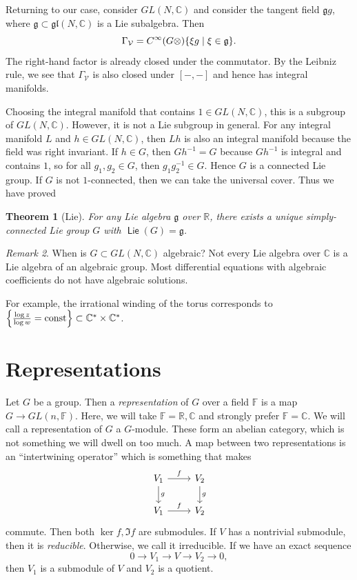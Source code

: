 \documentclass[leqno, openany]{memoir}
\newtheorem{thm}{Theorem}[section]
\theoremstyle{definition}
\theoremstyle{remark}
\newtheorem{rmk}[thm]{Remark}
\theoremstyle{plain}
\theoremstyle{definition}
\theoremstyle{remark}
\newcommand{\F}{\mathbb{F}}
\newcommand{\R}{\mathbb{R}}
\newcommand{\C}{\mathbb{C}}
\newcommand{\mc}[1]{\mathcal{#1}}
\newcommand{\mf}[1]{\mathfrak{#1}}
\newcommand{\mr}[1]{\mathrm{#1}}
\DeclareMathOperator{\Lie}{\mathsf{Lie}}
\begin{document}
Returning to our case, consider $GL(N, \C)$ and consider the tangent field $\mf{g} g$, where $\mf{g} \subset \mf{gl}(N, \C)$ is a Lie subalgebra. Then 
\[ \Gamma_{\mc{V}} = C^{\infty}(G \otimes) \qty{ \xi g \mid \xi \in \mf{g} }. \] 
The right-hand factor is already closed under the commutator. By the Leibniz rule, we see that $\Gamma_{\mc{V}}$ is also closed under $[-,-]$ and hence has integral manifolds.

Choosing the integral manifold that contains $1 \in GL(N, \C)$, this is a subgroup of $GL(N, \C)$. However, it is not a Lie subgroup in general. For any integral manifold $L$ and $h \in GL(N, \C)$, then $Lh$ is also an integral manifold because the field was right invariant. If $h \in G$, then $Gh^{-1} = G$ because $Gh^{-1}$ is integral and contains $1$, so for all $g_1, g_2 \in G$, then $g_1 g_2^{-1} \in G$. Hence $G$ is a connected Lie group. If $G$ is not $1$-connected, then we can take the universal cover. Thus we have proved

\begin{thm}[Lie]
    For any Lie algebra $\mf{g}$ over $\R$, there exists a unique simply-connected Lie group $G$ with $\Lie(G) = \mf{g}$.
\end{thm}

\begin{rmk}
    When is $G \subset GL(N, \C)$ algebraic? Not every Lie algebra over $\C$ is a Lie algebra of an algebraic group. Most differential equations with algebraic coefficients do not have algebraic solutions.

    For example, the irrational winding of the torus corresponds to $\qty{ \frac{\log z}{\log w} = \mr{const} } \subset \C^* \times \C^*$.
\end{rmk}

\chapter{Representations}%
\label{cha:representations}

Let $G$ be a group. Then a \textit{representation} of $G$ over a field $\F$ is a map $G \to GL(n, \F)$. Here, we will take $\F = \R, \C$ and strongly prefer $\F = \C$. We will call a representation of $G$ a $G$-module. These form an abelian category, which is not something we will dwell on too much. A map between two representations is an ``intertwining operator'' which is something that makes
\begin{equation*}
\begin{tikzcd}
    V_1 \arrow{r}{f} \arrow{d}{g} & V_2 \arrow{d}{g} \\
    V_1 \arrow{r}{f} & V_2
\end{tikzcd}
\end{equation*}
commute. Then both $\ker f, \Im f$ are submodules. If $V$ has a nontrivial submodule, then it is \textit{reducible}. Otherwise, we call it irreducible. If we have an exact sequence
\[ 0 \to V_1 \to V \to V_2 \to 0, \]
then $V_1$ is a submodule of $V$ and $V_2$ is a quotient.
\end{document}
